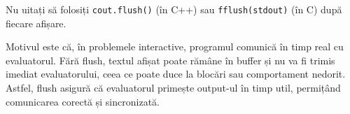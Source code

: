 \documentclass[12pt,a4paper]{article}
\begin{document}

Nu uitați să folosiți \texttt{cout.flush()} (în C++) sau
\texttt{fflush(stdout)} (în C) după fiecare afișare.

Motivul este că, în problemele interactive, programul comunică în timp real cu evaluatorul. Fără flush, textul afișat poate rămâne în buffer și nu va fi trimis imediat evaluatorului, ceea ce poate duce la blocări sau comportament nedorit. Astfel, flush asigură că evaluatorul primește output-ul în timp util, permițând comunicarea corectă și sincronizată.
\end{document}
